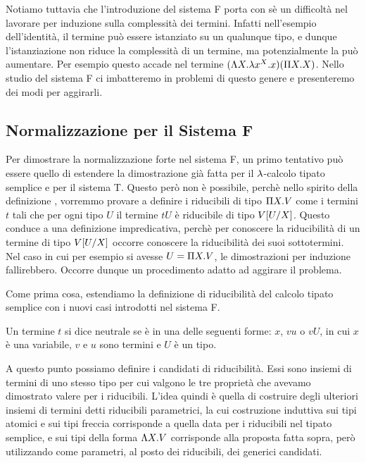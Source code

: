 \documentclass[]{marticle}
\begin{document}
Notiamo tuttavia che l'introduzione del sistema F porta con s\`e un difficolt\`a
nel lavorare per induzione sulla complessit\`a dei termini. Infatti nell'esempio
dell'identit\`a, il termine pu\`o essere istanziato su un qualunque tipo, e
dunque l'istanziazione non riduce la complessit\`a di un termine, ma
potenzialmente la pu\`o aumentare. Per esempio questo accade nel termine $(\L X.
\l x^X. x)(\P X. X)$. Nello studio del sistema F ci imbatteremo in problemi di
questo genere e presenteremo dei modi per aggirarli.

\subsection{Normalizzazione per il Sistema F}
Per dimostrare la normalizzazione forte nel sistema F, un primo tentativo pu\`o
essere quello di estendere la dimostrazione gi\`a fatta per il $\l$-calcolo
tipato semplice e per il sistema T. Questo per\`o non \`e possibile, perch\`e
nello spirito della definizione , vorremmo
provare a definire i riducibili di tipo $\P X. V$ come i termini $t$ tali che
per ogni tipo $U$ il termine $tU$ \`e riducibile di tipo $V\sub{U}{X}$. Questo
conduce a una definizione impredicativa, perch\`e per conoscere la
riducibilit\`a di un termine di tipo $V\sub{U}{X}$ occorre conoscere la
riducibilit\`a dei suoi sottotermini. Nel caso in cui per esempio si avesse $U =
\P X.V$, le dimostrazioni per induzione fallirebbero. Occorre dunque un
procedimento adatto ad aggirare il problema.

Come prima cosa, estendiamo la definizione di riducibilit\`a del calcolo tipato
semplice con i nuovi casi introdotti nel sistema F.
\begin{block}[Definizione]
    Un termine $t$ si dice neutrale se \`e in una delle seguenti forme: $x$,
    $vu$ o $vU$, in cui $x$ \`e una variabile, $v$ e $u$ sono termini e $U$ \`e
    un tipo.
\end{block}

A questo punto possiamo definire i candidati di riducibilit\`a. Essi sono
insiemi di termini di uno stesso tipo per cui valgono le tre propriet\`a che
avevamo dimostrato valere per i riducibili. L'idea quindi \`e quella di
costruire degli ulteriori insiemi di termini detti riducibili parametrici, la
cui costruzione induttiva sui tipi atomici e sui tipi freccia corrisponde a
quella data per i riducibili nel tipato semplice, e sui tipi della forma $\L
X.V$ corrisponde alla proposta fatta sopra, per\`o utilizzando come parametri,
al posto dei riducibili, dei generici candidati.
\end{document}
